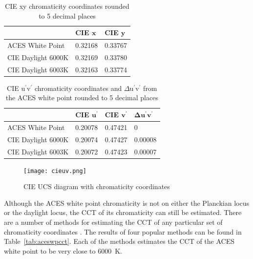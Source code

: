 \begin{table}[!ht]
    \centering
    \begin{tabularx}{.75\linewidth}{|l|Y|Y|}
    \hline
     & \textbf{CIE $\boldsymbol{x}$} & \textbf{CIE $\boldsymbol{y}$} \\ \hline
    ACES White Point & 0.32168 & 0.33767 \\ \hline
    CIE Daylight 6000K & 0.32169  & 0.33780 \\ \hline
	CIE Daylight 6003K & 0.32163  & 0.33774 \\ \hline
    \end{tabularx}
    \captionsetup{width=.75\textwidth}
    \caption{CIE xy chromaticity coordinates rounded to 5 decimal places \cite{tableValsPython}}
    \label{tab:ciexy}
\end{table}

\begin{table}[!ht]
    \centering
    \begin{tabularx}{.75\linewidth}{|l|Y|Y|Y|}
    \hline
     & \textbf{CIE $\boldsymbol{u^\prime}$} & \textbf{CIE $\boldsymbol{v^\prime}$} & $\boldsymbol{\Delta u^\prime v^\prime}$ \\ \hline
    ACES White Point & 0.20078 & 0.47421 & 0\\ \hline
    CIE Daylight 6000K & 0.20074 & 0.47427 & 0.00008 \\ \hline
	CIE Daylight 6003K & 0.20072 & 0.47423 & 0.00007 \\ \hline
    \end{tabularx}
    \captionsetup{width=.75\textwidth}
    \caption{CIE u$^\prime$v$^\prime$ chromaticity coordinates and $\Delta$u$^\prime$v$^\prime$ from the ACES white point rounded to 5 decimal places \cite{tableValsPython}}
    \label{tab:cieuv}
\end{table}

\begin{figure}[!ht]
    \centering
    \texttt{[image: cieuv.png]}
    \caption{CIE UCS diagram with chromaticity coordinates}
    \label{fig:cieuv}
\end{figure}

Although the ACES white point chromaticity is not on either the Planckian locus or the daylight locus, the CCT of its chromaticity can still be estimated.  There are a number of methods for estimating the CCT of any particular set of chromaticity coordinates \cite{robertson1968computation,mccamy1992correlated,hernandez1999calculating,Ohno2014}.  The results of four popular methods can be found in Table~\ref{tab:aceswpcct}.  Each of the methods estimates the CCT of the ACES white point to be very close to \SI[mode=text]{6000}{\kelvin}.

